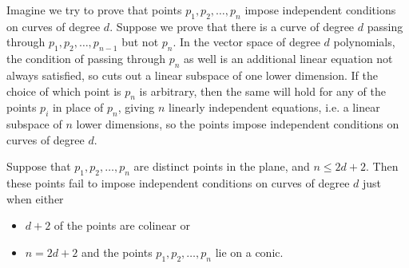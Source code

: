 Imagine we try to prove that points \(p_1,p_2,\dots,p_n\) impose independent conditions on curves of degree \(d\).
Suppose we prove that there is a curve of degree \(d\) passing through \(p_1,p_2,\dots,p_{n-1}\) but not \(p_n\).
In the vector space of degree \(d\) polynomials, the condition of passing through \(p_n\) as well is an additional linear equation not always satisfied, so cuts out a linear subspace of one lower dimension.
If the choice of which point is \(p_n\) is arbitrary, then the same will hold for any of the points \(p_i\) in place of \(p_n\), giving \(n\) linearly independent equations, i.e. a linear subspace of \(n\) lower dimensions, so the points impose independent conditions on curves of degree \(d\).

\begin{theorem}\label{theorem:independence}
Suppose that \(p_1,p_2,\dots,p_n\) are distinct points in the plane, and \(n \le 2d+2\).
Then these points fail to impose independent conditions on curves of degree \(d\) just when either 
\begin{itemize}
\item
\(d+2\) of the points are colinear or
\item
\(n=2d+2\) and the points \(p_1,p_2,\dots,p_n\) lie on a conic.
\end{itemize}
\end{theorem}

